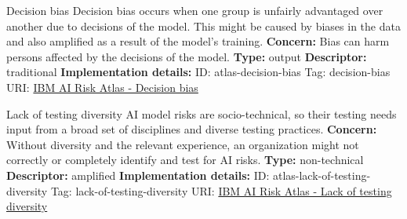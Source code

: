 \documentclass[a4paper,12pt]{article}
\begin{document}
\begin{definitionbox}{Decision bias}
Decision bias occurs when one group is unfairly advantaged over another due to decisions of the model. This might be caused by biases in the data and also amplified as a result of the model's training.\newline\newline
\textbf{Concern: }Bias can harm persons affected by the decisions of the model.\newline\newline
\textbf{Type: }output\newline
\textbf{Descriptor: }traditional \newline\newline
\textbf{Implementation details: } \newline
ID: atlas-decision-bias \newline
Tag: decision-bias \newline
URI:  \href{https://www.ibm.com/docs/en/watsonx/saas?topic=SSYOK8/wsj/ai-risk-atlas/decision-bias.html}{IBM AI Risk Atlas - Decision bias}\newline
\end{definitionbox}
\begin{definitionbox}{Lack of testing diversity}
AI model risks are socio-technical, so their testing needs input from a broad set of disciplines and diverse testing practices.\newline\newline
\textbf{Concern: }Without diversity and the relevant experience, an organization might not correctly or completely identify and test for AI risks.\newline\newline
\textbf{Type: }non-technical\newline
\textbf{Descriptor: }amplified \newline\newline
\textbf{Implementation details: } \newline
ID: atlas-lack-of-testing-diversity \newline
Tag: lack-of-testing-diversity \newline
URI:  \href{https://www.ibm.com/docs/en/watsonx/saas?topic=SSYOK8/wsj/ai-risk-atlas/lack-of-testing-diversity.html}{IBM AI Risk Atlas - Lack of testing diversity}\newline
\end{definitionbox}
\end{document}
